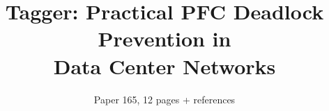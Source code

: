 \documentclass[10pt, sigconf, printonly]{acmart}
\newcommand{\sysname}{Tagger}
\begin{document}
	\title{\sysname{}: Practical PFC Deadlock Prevention in\\Data Center Networks}
	\author{Paper 165, 12 pages + references}


	\maketitle
	
	
	
	
	
	
	
	
	
	
	
	
	
	
	
	
	
\end{document}
